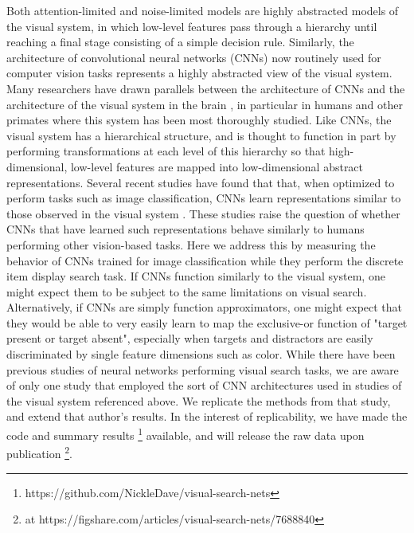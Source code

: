 \documentclass[10pt,letterpaper]{article}
\begin{document}
Both attention-limited and noise-limited models are highly abstracted models of the visual system,
in which low-level features pass through a hierarchy until reaching a final stage consisting of
a simple decision rule.
Similarly, the architecture of convolutional neural networks (CNNs) now routinely used for
computer vision tasks represents a highly abstracted view of the visual system.
Many researchers have drawn parallels between the architecture of CNNs and the 
architecture of the visual system in the brain \cite{kriegeskorteDeepNeuralNetworks2015}, 
in particular in humans and other primates where this system has been most thoroughly 
studied. Like CNNs, the visual system has a hierarchical structure, and is thought to 
function in part by performing transformations at each level of this hierarchy so that 
high-dimensional, low-level features are mapped into low-dimensional abstract 
representations. Several recent studies have found that that, when optimized to perform 
tasks such as image classification, CNNs learn representations similar to those 
observed in the visual system
\cite{khaligh-razaviDeepSupervisedNot2014, yaminsUsingGoaldrivenDeep2016, 
yaminsPerformanceoptimizedHierarchicalModels2014}. 
These studies raise the question of whether CNNs that have learned such 
representations behave similarly to humans performing other vision-based tasks. 
Here we address this by measuring the behavior of CNNs trained for image classification 
while they perform the discrete item display search task.
If CNNs function similarly to the visual system, 
one might expect them to be subject to the same limitations on visual search. Alternatively, 
if CNNs are simply function approximators, one might expect that they would be able to 
very easily learn to map the exclusive-or function of "target present or target absent", 
especially when targets and distractors are easily discriminated by single feature 
dimensions such as color. While there have been previous studies of neural networks 
performing visual search tasks, we are aware of only one study \cite{poderCapacityLimitationsVisual2017} 
that employed the sort of CNN architectures used in studies of the visual system referenced above.
We replicate the methods from that study, and extend that author's results.
In the interest of replicability, we have made the code and summary results \footnote{https://github.com/NickleDave/visual-search-nets} 
available, and will release the raw data upon publication \footnote{at https://figshare.com/articles/visual-search-nets/7688840}.
\end{document}

